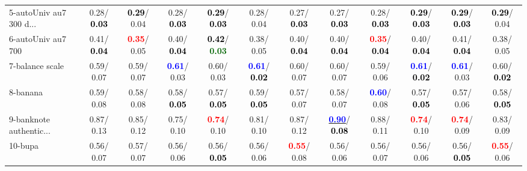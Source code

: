 \begin{table}[h]
\begin{center}
{\begin{tabular}{lc|c|c|c|c|c|c|c|c|c|c}
5-autoUniv au7 300 d... &   0.28/\textcolor{black}{\textbf{  0.03}} & \textcolor{black}{\textbf{  0.29}}/  0.04 &   0.28/\textcolor{black}{\textbf{  0.03}} & \textcolor{black}{\textbf{  0.29}}/\textcolor{black}{\textbf{  0.03}} &   0.28/  0.04 &   0.27/\textcolor{black}{\textbf{  0.03}} &   0.27/\textcolor{black}{\textbf{  0.03}} &   0.28/\textcolor{black}{\textbf{  0.03}} & \textcolor{black}{\textbf{  0.29}}/\textcolor{black}{\textbf{  0.03}} & \textcolor{black}{\textbf{  0.29}}/\textcolor{black}{\textbf{  0.03}} & \textcolor{black}{\textbf{  0.29}}/  0.04 \\
6-autoUniv au7 700 &   0.41/\textcolor{black}{\textbf{  0.04}} & \textcolor{red}{\textbf{  0.35}}/  0.05 &   0.40/\textcolor{black}{\textbf{  0.04}} & \textcolor{black}{\textbf{  0.42}}/\textcolor{darkgreen}{\textbf{  0.03}} &   0.38/  0.05 &   0.40/\textcolor{black}{\textbf{  0.04}} &   0.40/\textcolor{black}{\textbf{  0.04}} & \textcolor{red}{\textbf{  0.35}}/\textcolor{black}{\textbf{  0.04}} &   0.40/\textcolor{black}{\textbf{  0.04}} &   0.41/\textcolor{black}{\textbf{  0.04}} &   0.38/  0.05 \\
7-balance scale &   0.59/  0.07 &   0.59/  0.07 & \textcolor{blue}{\textbf{  0.61}}/  0.03 &   0.60/  0.03 & \textcolor{blue}{\textbf{  0.61}}/\textcolor{black}{\textbf{  0.02}} &   0.60/  0.07 &   0.60/  0.07 &   0.59/  0.06 & \textcolor{blue}{\textbf{  0.61}}/\textcolor{black}{\textbf{  0.02}} & \textcolor{blue}{\textbf{  0.61}}/  0.03 &   0.60/\textcolor{black}{\textbf{  0.02}} \\ \hline
8-banana &   0.59/  0.08 &   0.58/  0.08 &   0.58/\textcolor{black}{\textbf{  0.05}} &   0.57/\textcolor{black}{\textbf{  0.05}} &   0.59/\textcolor{black}{\textbf{  0.05}} &   0.57/  0.07 &   0.58/  0.07 & \textcolor{blue}{\textbf{  0.60}}/  0.08 &   0.57/\textcolor{black}{\textbf{  0.05}} &   0.57/  0.06 &   0.58/\textcolor{black}{\textbf{  0.05}} \\
9-banknote authentic... &   0.87/  0.13 &   0.85/  0.12 &   0.75/  0.10 & \textcolor{red}{\textbf{  0.74}}/  0.10 &   0.81/  0.10 &   0.87/  0.12 & \underline{\textcolor{blue}{\textbf{  0.90}}}/\textcolor{black}{\textbf{  0.08}} &   0.88/  0.11 & \textcolor{red}{\textbf{  0.74}}/  0.10 & \textcolor{red}{\textbf{  0.74}}/  0.09 &   0.83/  0.09 \\
10-bupa &   0.56/  0.07 &   0.57/  0.07 &   0.56/  0.06 &   0.56/\textcolor{black}{\textbf{  0.05}} &   0.56/  0.06 & \textcolor{red}{\textbf{  0.55}}/  0.08 &   0.56/  0.06 &   0.56/  0.07 &   0.56/  0.06 &   0.56/\textcolor{black}{\textbf{  0.05}} & \textcolor{red}{\textbf{  0.55}}/  0.06 \\

\end{tabular}}
\end{center}
\end{table}
